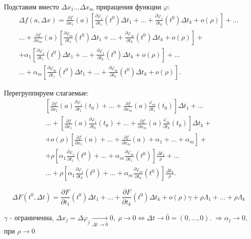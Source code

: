 \documentclass[a4paper,12pt]{article} %
\begin{document}
	Подставим вместо $\Delta x_1 \ldots \Delta x_m$ приращения функции $\varphi$:\\
	\begin{multline*}
		\Delta f(a, \Delta x) = \frac {\partial f}{\partial x_1}(a)\left[\frac{\partial \varphi_1}{\partial t_1}(t^0)\Delta t_1 + \ldots + \frac{\partial \varphi_1}{\partial t_k}(t^0)\Delta t_k + o(\rho)\right] + \ldots\\
		\ldots + \frac {\partial f}{\partial x_m}(a) \left[\frac{\partial \varphi_m}{\partial t_1}(t^0)\Delta t_1 + \ldots + \frac{\partial \varphi_m}{\partial t_k}(t^0)\Delta t_k + o(\rho)\right] +\\ +\alpha_1\left[\frac{\partial \varphi_1}{\partial t_1}(t^0)\Delta t_1 + \ldots + \frac{\partial \varphi_1}{\partial t_k}(t^0)\Delta t_k + o(\rho)\right] + \ldots \\
		\ldots + \alpha_m \left[\frac{\partial \varphi_m}{\partial t_1}(t^0)\Delta t_1 + \ldots + \frac{\partial \varphi_m}{\partial t_k}(t^0)\Delta t_k + o(\rho)\right].
	\end{multline*}
	
	Перегруппируем слагаемые:
	\begin{multline*}
		\left[\frac{\partial f}{\partial x_1}(a)\frac{\partial\varphi_1}{\partial t_1}(t_0) + \ldots + \frac{\partial f}{\partial x_m}(a)\frac{\varphi_m}{\partial t_1}(t_0)\right]\Delta t_1 + \ldots\\
		\ldots + \left[\frac{\partial f}{\partial x_1}(a)\frac{\partial\varphi_1}{\partial t_k}(t_0) + \ldots + \frac{\partial f}{\partial x_m}(a)\frac{\varphi_m}{\partial t_k}(t_0)\right]\Delta t_k + \\
		+o(\rho)\left[\frac{\partial f}{\partial x_1}(a) + \ldots + \frac{\partial f}{\partial x_m}(a) + \alpha_1 + \ldots + \alpha_m\right] + \\
		+\rho\left[\alpha_1\frac{\partial \varphi_1}{\partial t_1}(t^0) + \ldots + \alpha_m \frac{\partial \varphi_m}{\partial t_1}(t^0)\right]\frac{\Delta t_1}{\rho} + \ldots \\
		\ldots + \rho\left[\alpha_1\frac{\partial \varphi_1}{\partial t_k}(t^0) + \ldots + \alpha_m \frac{\partial \varphi_m}{\partial t_k}(t^0)\right]\frac{\Delta t_k}{\rho}. 
	\end{multline*}
	
	\[ \Delta F(t^0, \Delta t) = \frac{\partial F}{\partial t_1}(t^0)\Delta t_1 + \ldots + \frac{\partial F}{\partial t_k}(t^0)\Delta t_k + o(\rho)\gamma + \rho\Lambda_1 + \ldots + \rho \Lambda_k\]
	
	$\gamma$ - ограниченна, $\Delta x_j = \Delta \varphi_j \xrightarrow[\Delta t \to \bar 0 ]{} 0,\;
	\rho \to 0 \Leftrightarrow \Delta t \to \bar0 = (0, \ldots, 0). \; \Rightarrow \alpha_j \to 0$, при $\rho \to 0$
	
\end{document}
